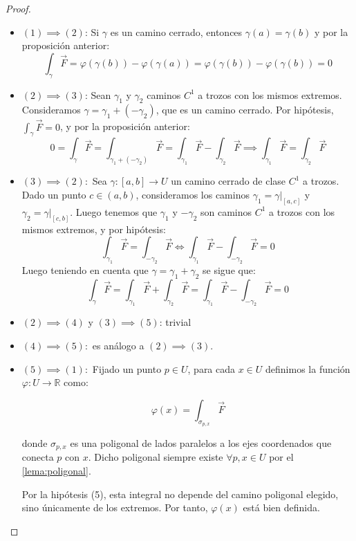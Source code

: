 \begin{proof}
    \leavevmode
    \begin{itemize}
        \item $(1) \implies (2)$: Si $\gamma$ es un camino cerrado, entonces $\gamma(a) = \gamma(b)$ y por la proposición anterior:
              \[
                  \int_{\gamma} \vec{F} = \varphi(\gamma(b)) - \varphi(\gamma(a)) = \varphi(\gamma(b)) - \varphi(\gamma(b)) = 0
              \]
        \item $(2) \implies (3)$: Sean $\gamma_1$ y $\gamma_2$ caminos $C^1$ a trozos con los mismos extremos. Consideramos $\gamma = \gamma_1 + (-\gamma_2)$, que es un camino cerrado. Por hipótesis, $\int_{\gamma} \vec{F} = 0$, y por la proposición anterior:
              \[
                  0 = \int_{\gamma} \vec{F} = \int_{\gamma_1 + (-\gamma_2)} \vec{F} = \int_{\gamma_1} \vec{F} - \int_{\gamma_2} \vec{F} \implies \int_{\gamma_1} \vec{F} = \int_{\gamma_2} \vec{F}
              \]
        \item $(3) \implies (2):$ Sea $\gamma : [a,b] \to U$ un camino cerrado de clase $C^1$ a trozos. Dado un punto $c \in (a,b)$, consideramos los caminos $\gamma_1 = \gamma |_{[a,c]}$ y $\gamma_2 = \gamma |_{[c,b]}$. Luego tenemos que $\gamma_1$ y $-\gamma_2$ son caminos $C^1$ a trozos con los mismos extremos, y por hipótesis:
            \[
                \int_{\gamma_1} \vec{F} = \int_{-\gamma_2} \vec{F} \iff \int_{\gamma_1} \vec{F} - \int_{-\gamma_2} \vec{F} = 0
            \]
            Luego teniendo en cuenta que $\gamma = \gamma_1 + \gamma_2$ se sigue que:
            \[
                \int_{\gamma} \vec{F} = \int_{\gamma_1} \vec{F} + \int_{\gamma_2} \vec{F} = \int_{\gamma_1} \vec{F} - \int_{-\gamma_2} \vec{F} = 0
            \]
        \item $(2) \implies (4)$ y $(3) \implies (5)$: trivial
        \item $(4) \implies (5):$ es análogo a $(2) \implies (3)$.
        \item $(5) \implies (1):$ Fijado un punto $p \in U$, para cada $x \in U$ definimos la función \(\varphi : U \to \mathbb{R}\) como:

        \[
        \varphi(x) = \int_{\sigma_{p,x}} \vec{F}
        \]
        
        donde \(\sigma_{p,x}\) es una poligonal de lados paralelos a los ejes coordenados que conecta \(p\) con \(x\). Dicho poligonal siempre existe $\forall p, x \in U$ por el \cref{lema:poligonal}.
        
        Por la hipótesis (5), esta integral no depende del camino poligonal elegido, sino únicamente de los extremos. Por tanto, \(\varphi(x)\) está bien definida.


\end{itemize}
\end{proof}
